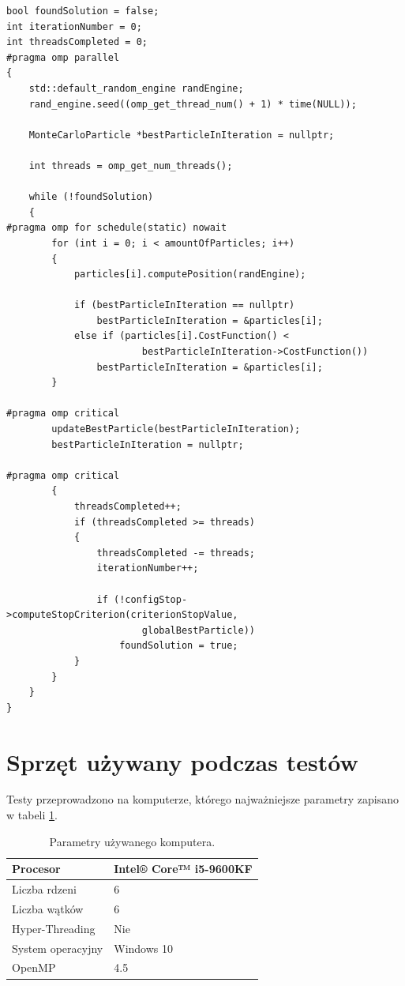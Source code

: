 \documentclass[11pt, a4paper, oneside]{article}
\begin{document}
\begin{lstlisting}[style=mycpp, label=code:mc_after, caption={Optymalizacja Monte Carlo - kod równoległy.}]
bool foundSolution = false;
int iterationNumber = 0;
int threadsCompleted = 0;
#pragma omp parallel
{
    std::default_random_engine randEngine;
    rand_engine.seed((omp_get_thread_num() + 1) * time(NULL));

    MonteCarloParticle *bestParticleInIteration = nullptr;

    int threads = omp_get_num_threads();

    while (!foundSolution)
    {
#pragma omp for schedule(static) nowait
        for (int i = 0; i < amountOfParticles; i++)
        {
            particles[i].computePosition(randEngine);

            if (bestParticleInIteration == nullptr)
                bestParticleInIteration = &particles[i];
            else if (particles[i].CostFunction() <
                        bestParticleInIteration->CostFunction())
                bestParticleInIteration = &particles[i];
        }

#pragma omp critical
        updateBestParticle(bestParticleInIteration);
        bestParticleInIteration = nullptr;

#pragma omp critical
        {
            threadsCompleted++;
            if (threadsCompleted >= threads)
            {
                threadsCompleted -= threads;
                iterationNumber++;

                if (!configStop->computeStopCriterion(criterionStopValue,
                        globalBestParticle))
                    foundSolution = true;
            }
        }
    }
}
\end{lstlisting}

\section{Sprzęt używany podczas testów} 

Testy przeprowadzono na komputerze, którego najważniejsze parametry zapisano w tabeli \ref{tab:parametry}.

\begin{table}[h]
\centering
\begin{tabular}{|l|l|}
\hline
Procesor          & Intel® Core™ i5-9600KF \\ \hline
Liczba rdzeni     & 6                              \\ \hline
Liczba wątków     & 6                              \\ \hline
Hyper-Threading   & Nie                                 \\ \hline
System operacyjny & Windows 10       \\ \hline
OpenMP			  & 4.5							        \\ \hline
\end{tabular}
\caption{Parametry używanego komputera.}
\label{tab:parametry}
\end{table}
\end{document}
